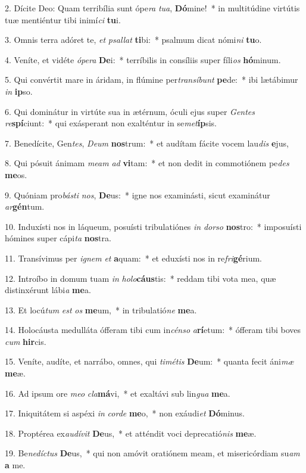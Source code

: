 2. Dícite Deo: Quam terribília sunt ópe\textit{ra} \textit{tu}\textit{a}, \textbf{Dó}mine!~*  in multitúdine virtútis tuæ mentiéntur tibi inimí\textit{ci} \textbf{tu}i.\

3. Omnis terra adóret te, \textit{et} \textit{psal}\textit{lat} \textbf{ti}bi:~*  psalmum dicat nómi\textit{ni} \textbf{tu}o.\

4. Veníte, et vidéte \textit{ó}\textit{pe}\textit{ra} \textbf{De}i:~*  terríbilis in consíliis super fíli\textit{os} \textbf{hó}minum.\

5. Qui convértit mare in áridam, in flúmine per\textit{trans}\textit{í}\textit{bunt} \textbf{pe}de:~*  ibi lætábimur \textit{in} \textbf{ip}so.\

6. Qui dominátur in virtúte sua in ætérnum, óculi ejus super \textit{Gen}\textit{tes} \textit{re}\textbf{spí}ciunt:~*  qui exásperant non exalténtur in se\textit{met}\textbf{íp}sis.\

7. Benedícite, Gen\textit{tes}, \textit{De}\textit{um} \textbf{nos}trum:~*  et audítam fácite vocem lau\textit{dis} \textbf{e}jus,\

8. Qui pósuit ánimam \textit{me}\textit{am} \textit{ad} \textbf{vi}tam:~*  et non dedit in commotiónem pe\textit{des} \textbf{me}os.\

9. Quóniam pro\textit{bás}\textit{ti} \textit{nos}, \textbf{De}us:~*  igne nos examinásti, sicut examinátur \textit{ar}\textbf{gén}tum.\

10. Induxísti nos in láqueum, posuísti tribulatiónes \textit{in} \textit{dor}\textit{so} \textbf{nos}tro:~*  imposuísti hómines super cápi\textit{ta} \textbf{nos}tra.\

11. Transívimus per \textit{i}\textit{gnem} \textit{et} \textbf{a}quam:~*  et eduxísti nos in re\textit{fri}\textbf{gé}rium.\

12. Introíbo in domum tuam \textit{in} \textit{ho}\textit{lo}\textbf{cáus}tis:~*  reddam tibi vota mea, quæ distinxérunt lábi\textit{a} \textbf{me}a.\

13. Et locú\textit{tum} \textit{est} \textit{os} \textbf{me}um,~*  in tribulatió\textit{ne} \textbf{me}a.\

14. Holocáusta medulláta ófferam tibi cum in\textit{cén}\textit{so} \textit{a}\textbf{rí}etum:~*  ófferam tibi boves \textit{cum} \textbf{hir}cis.\

15. Veníte, audíte, et narrábo, omnes, qui \textit{ti}\textit{mé}\textit{tis} \textbf{De}um:~*  quanta fecit áni\textit{mæ} \textbf{me}æ.\

16. Ad ipsum ore \textit{me}\textit{o} \textit{cla}\textbf{má}vi,~*  et exaltávi sub lin\textit{gua} \textbf{me}a.\

17. Iniquitátem si aspéxi \textit{in} \textit{cor}\textit{de} \textbf{me}o,~*  non exáudi\textit{et} \textbf{Dó}minus.\

18. Proptérea ex\textit{au}\textit{dí}\textit{vit} \textbf{De}us,~*  et atténdit voci deprecatió\textit{nis} \textbf{me}æ.\

19. Be\textit{ne}\textit{díc}\textit{tus} \textbf{De}us,~*  qui non amóvit oratiónem meam, et misericórdiam su\textit{am} \textbf{a} me.\


